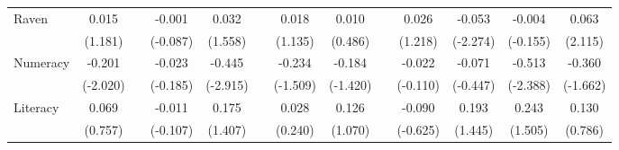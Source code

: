 \begin{table}[htbp]
{\begin{tabular}{lcccccccccccc}
    Raven & 0.015 &       & -0.001 & 0.032 &       & 0.018 & 0.010 &       & 0.026 & \cellcolor[rgb]{ 1,  1,  0}-0.053 & -0.004 & \cellcolor[rgb]{ 1,  1,  0}0.063 \\
          & (1.181) &       & (-0.087) & (1.558) &       & (1.135) & (0.486) &       & (1.218) & (-2.274) & (-0.155) & (2.115) \\
    Numeracy & \cellcolor[rgb]{ 1,  1,  0}-0.201 &       & -0.023 & \cellcolor[rgb]{ 1,  1,  0}-0.445 &       & -0.234 & -0.184 &       & -0.022 & -0.071 & \cellcolor[rgb]{ 1,  1,  0}-0.513 & \cellcolor[rgb]{ 1,  1,  0}-0.360 \\
          & (-2.020) &       & (-0.185) & (-2.915) &       & (-1.509) & (-1.420) &       & (-0.110) & (-0.447) & (-2.388) & (-1.662) \\
    Literacy & 0.069 &       & -0.011 & 0.175 &       & 0.028 & 0.126 &       & -0.090 & 0.193 & 0.243 & 0.130 \\
          & (0.757) &       & (-0.107) & (1.407) &       & (0.240) & (1.070) &       & (-0.625) & (1.445) & (1.505) & (0.786) \\



\end{tabular}}
\end{table}
